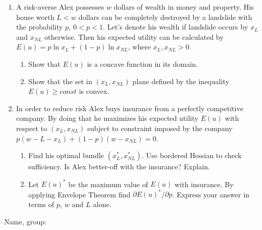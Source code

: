 \documentclass[12pt,a4paper]{article}
\begin{document}
\begin{enumerate}[resume]
\item A risk-averse Alex possesses $w$ dollars of wealth in money and property.  His house worth $L < w$ dollars can be completely destroyed by a landslide with the probability $p$, $0 < p < 1$. Let’s denote his wealth if landslide occurs by $x_L$ and $x_{NL}$ otherwise. Then his expected utility can be calculated by $E(u) = p \ln x_L + (1-p) \ln x_{NL}$, where $x_L, x_{NL} > 0$.
\begin{enumerate}
\item Show that $E(u)$ is a concave function in its domain.
\item Show that the set in  $(x_L, x_{NL})$ plane defined by the inequality $E(u)\geq const$  is convex.
\end{enumerate}

\item In order to reduce risk Alex buys insurance from a perfectly competitive company. By doing that he maximizes his expected utility $E(u)$ with respect to $(x_L, x_{NL})$ subject to constraint imposed by the company $p(w-L-x_L)+(1-p)(w-x_{NL})=0$.
\begin{enumerate}
\item  Find his optimal bundle  $(x_L^*, x_{NL}^*)$. Use bordered Hessian to check sufficiency. Is Alex better-off with the insurance? Explain.
\item Let $E(u)^*$ be the maximum value of $E(u)$ with insurance. By applying Envelope Theorem find $\partial E(u)^* / \partial p$. Express your answer in terms of $p$, $w$ and $L$ alone.
\end{enumerate}


\end{enumerate}

\begin{framed}
\begin{minipage}{42em}
Name, group:\vspace*{3ex}\par 
\noindent\dotfill
\end{minipage}
\end{framed}
\end{document}
